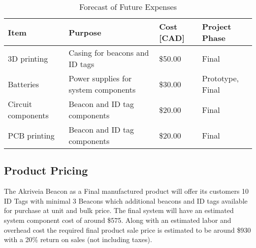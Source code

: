 \begin{table}[H]
\centering
\def\arraystretch{1.3}
\begin{tabular}{ | m{3.5cm} | m{6.25cm} | m{2.5cm} | m{3cm} |}
\hline
\textbf{Item} & \textbf{Purpose} & \textbf{Cost [CAD]} & \textbf{Project Phase}  \\
\hline
3D printing & Casing for beacons and ID tags & \$50.00 & Final  \\
\hline
Batteries & Power supplies for system components & \$30.00 & Prototype, Final \\
\hline
Circuit components & Beacon and ID tag components & \$20.00 & Final \\
\hline
PCB printing & Beacon and ID tag components & \$20.00 & Final \\
\hline
\end{tabular}
\caption{Forecast of Future Expenses}
\end{table}

\pagebreak
\subsection{Product Pricing}
\medskip
The Akriveia Beacon as a Final manufactured product will offer its customers 10 ID Tags with minimal 3 Beacons which additional beacons and ID tags available for purchase at unit and bulk price. The final system will have an estimated system component cost of around \$575. Along with an estimated labor and overhead cost the required final product sale price is estimated to be around \$930 with a 20\% return on sales (not including taxes).



